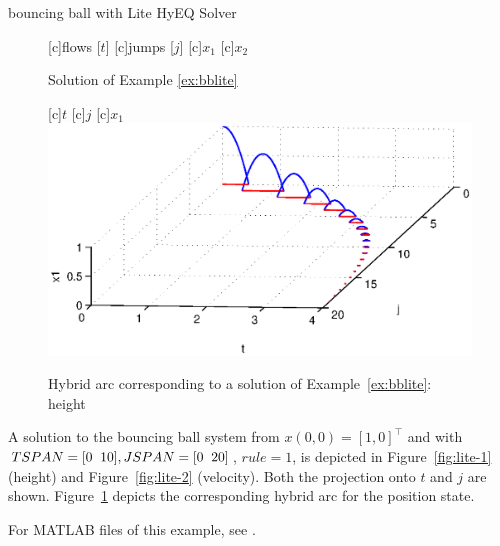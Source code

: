 \begin{example}{bouncing ball with Lite HyEQ Solver}
\begin{figure}[ht]
  \centering
  [c]{flows [$t$]}
  [c]{jumps [$j$]}
  [c]{$x_1$}
  [c]{$x_2$}
\qquad
{}
\caption{Solution of Example \ref{ex:bblite}}
\end{figure}

\begin{figure}[ht]
  \begin{center}
  [c]{$t$}
  [c]{$j$}
  [c]{$x_1$}
    \includegraphics[width=.8\textwidth]{figures/Examples/HybridArclite.eps}
   \caption{Hybrid arc corresponding to a solution of Example~\ref{ex:bblite}: height}
\label{fig:lite-3}
  \end{center}
\end{figure}

A solution to the bouncing ball system from $x(0,0)=[1,0]^\top$ and with $TSPAN = [0 \hspace{2mm} 10], JSPAN = [0 \hspace{2mm} 20]$, $rule =1$, is depicted in Figure~\ref{fig:lite-1} (height) and Figure~\ref{fig:lite-2} (velocity).  Both the projection onto $t$ and $j$ are shown. Figure~\ref{fig:lite-3} depicts the corresponding hybrid arc for the position state.

For MATLAB files of this example, see .

\end{example}
